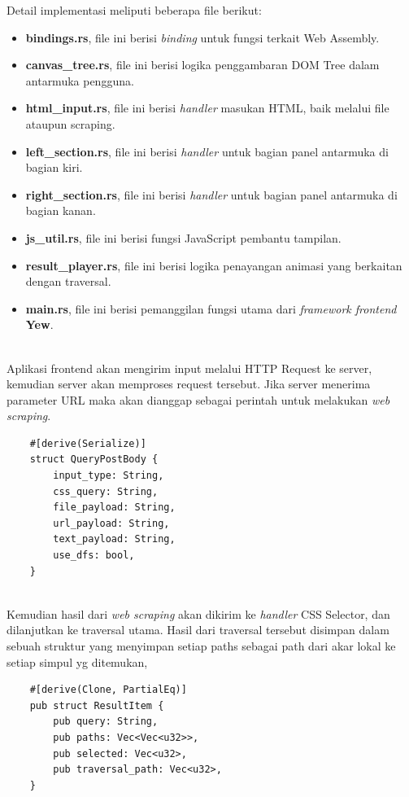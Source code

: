 \documentclass[12pt,a4paper]{article}
\begin{document}
\begin{itemize}
Detail implementasi meliputi beberapa file berikut:
\begin{itemize}
    \item \textbf{bindings.rs}, file ini berisi \textit{binding} untuk fungsi terkait Web Assembly.
    \item \textbf{canvas\_tree.rs}, file ini berisi logika penggambaran DOM Tree dalam antarmuka pengguna.
    \item \textbf{html\_input.rs}, file ini berisi \textit{handler} masukan HTML, baik melalui file ataupun scraping.
    \item \textbf{left\_section.rs}, file ini berisi \textit{handler} untuk bagian panel antarmuka di bagian kiri.
    \item \textbf{right\_section.rs}, file ini berisi \textit{handler} untuk bagian panel antarmuka di bagian kanan.
    \item \textbf{js\_util.rs}, file ini berisi fungsi JavaScript pembantu tampilan.
    \item \textbf{result\_player.rs}, file ini berisi logika penayangan animasi yang berkaitan dengan traversal.
    \item \textbf{main.rs}, file ini berisi pemanggilan fungsi utama dari \textit{framework frontend} \textbf{Yew}.
\end{itemize} \\

Aplikasi frontend akan mengirim input melalui HTTP Request ke server, kemudian server akan memproses request tersebut.
Jika server menerima parameter URL maka akan dianggap sebagai perintah untuk melakukan \textit{web scraping}. \\

\begin{verbatim}
    #[derive(Serialize)]
    struct QueryPostBody {
        input_type: String,
        css_query: String,
        file_payload: String,
        url_payload: String,
        text_payload: String,
        use_dfs: bool,
    }
\end{verbatim} \\

Kemudian hasil dari \textit{web scraping} akan dikirim ke \textit{handler} CSS Selector, dan dilanjutkan ke traversal utama.
Hasil dari traversal tersebut disimpan dalam sebuah struktur yang menyimpan setiap paths sebagai path dari akar lokal ke setiap simpul yg ditemukan, \\

\begin{verbatim}
    #[derive(Clone, PartialEq)]
    pub struct ResultItem {
        pub query: String,
        pub paths: Vec<Vec<u32>>,
        pub selected: Vec<u32>,
        pub traversal_path: Vec<u32>,
    }
\end{verbatim} \\


\end{itemize}
\end{document}

